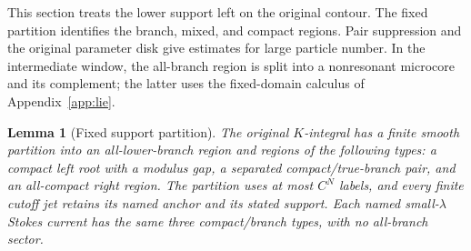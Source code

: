 \documentclass[11pt]{article}
\numberwithin{equation}{section}
\newtheorem{lemma}[theorem]{Lemma}
\theoremstyle{definition}
\begin{document}
This section treats the lower support left on the original contour.
The fixed partition identifies the branch, mixed, and compact regions.
Pair suppression and the original parameter disk give estimates for
large particle number. In the intermediate window, the all-branch
region is split into a nonresonant microcore and its complement; the
latter uses the fixed-domain calculus of Appendix~\ref{app:lie}.
\begin{lemma}[Fixed support partition]\label{lem:partition}
The original \(K\)-integral has a finite smooth partition into an
all-lower-branch region and regions of the following types: a compact
left root with a modulus gap, a separated compact/true-branch pair,
and an all-compact right region. The partition uses at most \(C^N\)
labels, and every finite cutoff jet retains its named anchor and its
stated support.
Each named small-\(\lambda\) Stokes current has the same three
compact/branch types, with no all-branch sector.
\end{lemma}
\end{document}
